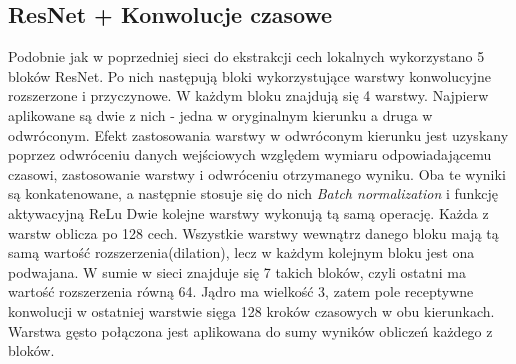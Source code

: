 \documentclass[a4paper,11pt,twoside]{report}
\theoremstyle{definition}
\begin{document}
\subsection{ResNet + Konwolucje czasowe}

Podobnie jak w poprzedniej sieci do ekstrakcji cech lokalnych wykorzystano 5 bloków ResNet. Po nich następują bloki wykorzystujące warstwy konwolucyjne rozszerzone i przyczynowe. W każdym bloku znajdują się 4 warstwy. Najpierw aplikowane są dwie z nich - jedna w oryginalnym kierunku a druga w odwróconym. Efekt zastosowania warstwy w odwróconym kierunku jest uzyskany poprzez odwróceniu danych wejściowych względem wymiaru odpowiadającemu czasowi, zastosowanie warstwy i odwróceniu otrzymanego wyniku. Oba te wyniki są konkatenowane, a następnie stosuje się do nich \textit{Batch normalization} i funkcję aktywacyjną ReLu Dwie kolejne warstwy wykonują tą samą operację. Każda z warstw oblicza po 128 cech. Wszystkie warstwy wewnątrz danego bloku mają tą samą wartość rozszerzenia(dilation), lecz w każdym kolejnym bloku jest ona podwajana. W sumie w sieci znajduje się 7 takich bloków, czyli ostatni ma wartość rozszerzenia równą 64. Jądro ma wielkość 3, zatem pole receptywne konwolucji w ostatniej warstwie sięga 128 kroków czasowych w obu kierunkach. Warstwa gęsto połączona jest aplikowana do sumy wyników obliczeń każdego z bloków.
\end{document}
